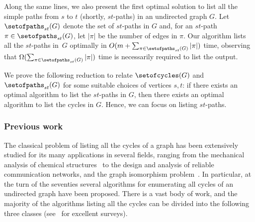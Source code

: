 Along the same lines, we also present the first optimal solution to
list all the simple paths from $s$ to $t$ (shortly, $st$-paths) in an
undirected graph $G$. Let $\setofpaths_{st}(G)$ denote the set of
$st$-paths in $G$ and, for an $st$-path $\pi \in \setofpaths_{st}(G)$,
let $|\pi|$ be the number of edges in $\pi$.  Our algorithm lists
all the $st$-paths in~$G$ optimally in $O(m + \sum_{\pi \in
  \setofpaths_{st}(G)}{|\pi|})$ time, observing that $\Omega(\sum_{\pi
  \in \setofpaths_{st}(G)}{|\pi|})$ time is necessarily required to
list the output.  

We prove the following reduction to relate
$\setofcycles(G)$ and $\setofpaths_{st}(G)$ for some suitable choices
of vertices $s,t$: if there exists an optimal algorithm to list the
$st$-paths in $G$, then there exists an optimal algorithm to list the
cycles in $G$.  Hence, we can focus on listing $st$-paths.

\subsubsection{Previous work}

The classical problem of listing all the cycles of a graph has been
extensively studied for its many applications in several fields,
ranging from the mechanical analysis of chemical
structures~\cite{Sussenguth65} to the design and analysis of reliable
communication networks, and the graph isomorphism
problem~\cite{Welch66}.
In particular, at the turn of the seventies several algorithms for
enumerating all cycles of an undirected graph have been proposed.
There is a vast body of work, and the majority of the algorithms
listing all the cycles can be divided into the following three classes
(see~\cite{Bezem87,Mateti76} for excellent surveys).

